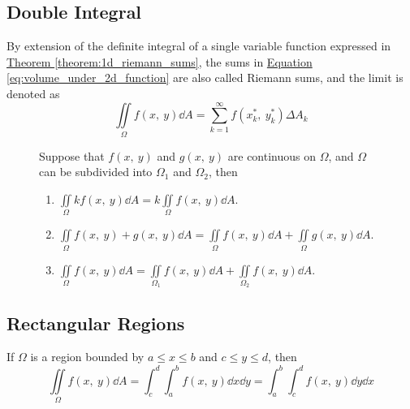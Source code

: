 \documentclass{article}
\begin{document}
\subsection{Double Integral}
\begin{definition}
    By extension of the definite integral of a single variable function expressed in
    \hyperref[theorem:1d_riemann_sums]{Theorem \ref{theorem:1d_riemann_sums}}, the sums in
    \hyperref[eq:volume_under_2d_function]{Equation \ref{eq:volume_under_2d_function}}
    are also called Riemann sums, and the limit is denoted as
    \begin{equation*}
        \iint\limits_{\Omega} f(x,\: y)  \dd{A}
        = \sum_{k=1}^{\infty} f(x_k^\ast,\: y_k^\ast) \Delta A_k
    \end{equation*}
\end{definition}
\begin{figure}[H]
	\begin{mdframed}[style=exampledefault,frametitle={Properties of Double Integrals}]
		\begin{theorem}
            Suppose that $f(x,\: y) $ and $g(x,\: y)$ are continuous on $\Omega$,
            and $\Omega$ can be subdivided into $\Omega_1$ and $\Omega_2$, then
			\begin{enumerate}[label=\normalfont\alph*)]
				\item $\displaystyle\iint\limits_\Omega kf(x,\: y) \dd{A}
                    = k\iint\limits_\Omega f(x,\: y) \dd{A}$.
				\item $\displaystyle\iint\limits_\Omega f(x,\: y) + g(x,\: y) \dd{A}
                    = \iint\limits_\Omega f(x,\: y) \dd{A} + \iint\limits_\Omega g(x,\: y) \dd{A}$.
                \item $\displaystyle\iint\limits_\Omega f(x,\: y) \dd{A}
                    = \iint\limits_{\Omega_1} f(x,\: y) \dd{A} + \iint\limits_{\Omega_2} f(x,\: y) \dd{A}$.
			\end{enumerate}
		\end{theorem}
	\end{mdframed}
\end{figure}
\subsection{Rectangular Regions}
If $\Omega$ is a region bounded by $a \leq x \leq b$ and $c \leq y \leq d$, then
\begin{equation*}
    \iint\limits_{\Omega} f(x,\: y) \dd{A} = \int_c^d\int_a^b f(x,\: y) \dd{x} \dd{y} = \int_a^b\int_c^d f(x,\: y) \dd{y} \dd{x}
\end{equation*}
\end{document}
